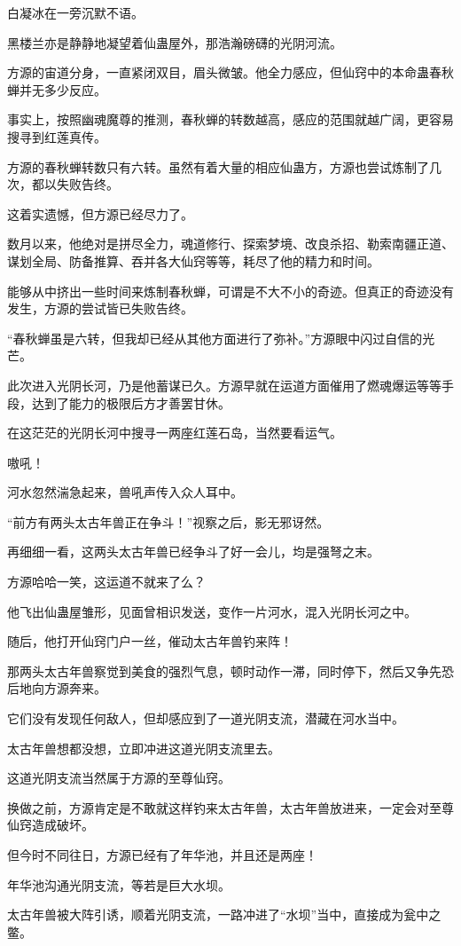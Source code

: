 \begin{this_body}
白凝冰在一旁沉默不语。

黑楼兰亦是静静地凝望着仙蛊屋外，那浩瀚磅礴的光阴河流。

方源的宙道分身，一直紧闭双目，眉头微皱。他全力感应，但仙窍中的本命蛊春秋蝉并无多少反应。

事实上，按照幽魂魔尊的推测，春秋蝉的转数越高，感应的范围就越广阔，更容易搜寻到红莲真传。

方源的春秋蝉转数只有六转。虽然有着大量的相应仙蛊方，方源也尝试炼制了几次，都以失败告终。

这着实遗憾，但方源已经尽力了。

数月以来，他绝对是拼尽全力，魂道修行、探索梦境、改良杀招、勒索南疆正道、谋划全局、防备推算、吞并各大仙窍等等，耗尽了他的精力和时间。

能够从中挤出一些时间来炼制春秋蝉，可谓是不大不小的奇迹。但真正的奇迹没有发生，方源的尝试皆已失败告终。

“春秋蝉虽是六转，但我却已经从其他方面进行了弥补。”方源眼中闪过自信的光芒。

此次进入光阴长河，乃是他蓄谋已久。方源早就在运道方面催用了燃魂爆运等等手段，达到了能力的极限后方才善罢甘休。

在这茫茫的光阴长河中搜寻一两座红莲石岛，当然要看运气。

嗷吼！

河水忽然湍急起来，兽吼声传入众人耳中。

“前方有两头太古年兽正在争斗！”视察之后，影无邪讶然。

再细细一看，这两头太古年兽已经争斗了好一会儿，均是强弩之末。

方源哈哈一笑，这运道不就来了么？

他飞出仙蛊屋雏形，见面曾相识发送，变作一片河水，混入光阴长河之中。

随后，他打开仙窍门户一丝，催动太古年兽钓来阵！

那两头太古年兽察觉到美食的强烈气息，顿时动作一滞，同时停下，然后又争先恐后地向方源奔来。

它们没有发现任何敌人，但却感应到了一道光阴支流，潜藏在河水当中。

太古年兽想都没想，立即冲进这道光阴支流里去。

这道光阴支流当然属于方源的至尊仙窍。

换做之前，方源肯定是不敢就这样钓来太古年兽，太古年兽放进来，一定会对至尊仙窍造成破坏。

但今时不同往日，方源已经有了年华池，并且还是两座！

年华池沟通光阴支流，等若是巨大水坝。

太古年兽被大阵引诱，顺着光阴支流，一路冲进了“水坝”当中，直接成为瓮中之鳖。


\end{this_body}
